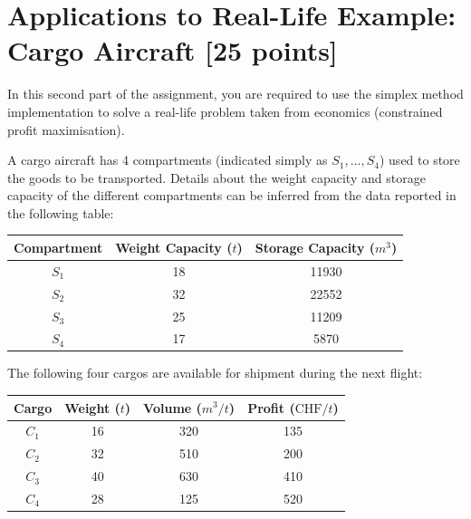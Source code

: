 \documentclass[unicode,11pt,a4paper,oneside,numbers=endperiod,openany]{scrartcl}
\begin{document}
\section{Applications to Real-Life Example: Cargo Aircraft [25 points]}

In this second part of the assignment, you are required to use the simplex method implementation to solve a real-life problem taken from economics (constrained profit maximisation).

A cargo aircraft has 4 compartments (indicated simply as $S_1,\dots,S_4$) used to store the goods to be transported. Details about the weight capacity and storage capacity of the different compartments can be inferred from the data reported in the following table: 

\begin{center}
 \begin{tabular}{||c | c | c ||} 
 \hline
 Compartment & Weight Capacity ($t$) & Storage Capacity ($m^3$) \\ [0.5ex] 
 \hline\hline
 $S_1$ & 18 & 11930\\ 
 \hline
 $S_2$ & 32 & 22552\\
 \hline
 $S_3$ & 25 & 11209\\
 \hline
 $S_4$ & 17 & 5870\\
 \hline
\end{tabular}
\end{center}

The following four cargos are available for shipment during the next flight:

\begin{center}
 \begin{tabular}{|| c | c | c | c ||} 
 \hline
 Cargo & Weight ($t$) & Volume ($m^3/t$) & Profit ($\text{CHF}/t$) \\ [0.5ex] 
 \hline\hline
 $C_1$ & 16  & 320 & 135 \\ 
 \hline
 $C_2$ & 32  & 510 & 200 \\
 \hline
 $C_3$ & 40 & 630 & 410 \\
 \hline
 $C_4$ & 28 & 125 & 520 \\
 \hline
\end{tabular}
\end{center}
\end{document}
